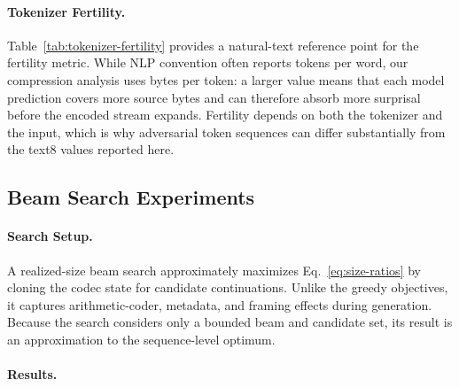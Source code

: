 



\paragraph{Tokenizer Fertility.}
Table~\ref{tab:tokenizer-fertility} provides a natural-text reference point for
the fertility metric. While NLP convention often reports tokens per word, our
compression analysis uses bytes per token: a larger value means that each model
prediction covers more source bytes and can therefore absorb more surprisal
before the encoded stream expands. Fertility depends on both the tokenizer and
the input, which is why adversarial token sequences can differ substantially
from the text8 values reported here.



\subsection{Beam Search Experiments}
\label{app:beam-search}

\paragraph{Search Setup.}
A realized-size beam search approximately maximizes Eq.~\ref{eq:size-ratios}
by cloning the codec state for candidate continuations. Unlike the greedy
objectives, it captures arithmetic-coder, metadata, and framing effects during
generation. Because the search considers only a bounded beam and candidate set,
its result is an approximation to the sequence-level optimum.

\paragraph{Results.}
